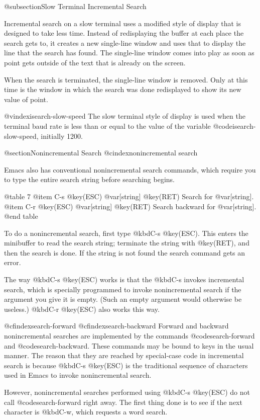 {{{{{{@subsection{Slow Terminal Incremental Search}

  Incremental search on a slow terminal uses a modified style of
display that is designed to take less time.  Instead of redisplaying
the buffer at each place the search gets to, it creates a new single-line
window and uses that to display the line that the search has found.
The single-line window comes into play as soon as point gets outside
of the text that is already on the screen.

  When the search is terminated, the single-line window is removed.
Only at this time is the window in which the search was done
redisplayed to show its new value of point.

@vindex{isearch-slow-speed}
  The slow terminal style of display is used when the terminal baud
rate is less than or equal to the value of the variable
@code{isearch-slow-speed}, initially 1200.

@section{Nonincremental Search}
@cindex{nonincremental search}

  Emacs also has conventional nonincremental search commands, which
require you to type the entire search string before searching begins.

@table 7
@item C-s @key(ESC) @var[string] @key(RET)
Search for @var[string].
@item C-r @key(ESC) @var[string] @key(RET)
Search backward for @var[string].
@end table

  To do a nonincremental search, first type @kbd{C-s @key(ESC)}.
This enters the minibuffer to read the search string; terminate the
string with @key(RET), and then the search is done.  If the string is
not found the search command gets an error.

  The way @kbd{C-s @key(ESC)} works is that the @kbd{C-s} invokes
incremental search, which is specially programmed to invoke nonincremental
search if the argument you give it is empty.  (Such an empty argument would
otherwise be useless.)  @kbd{C-r @key(ESC)} also works this way.

@cfindex{search-forward}
@cfindex{search-backward}
  Forward and backward nonincremental searches are implemented by the commands
@code{search-forward} and @code{search-backward}.  These commands may be
bound to keys in the usual manner.  The reason that they are reached by
special-case code in incremental search is because @kbd{C-s @key(ESC)}
is the traditional sequence of characters used in Emacs to invoke
nonincremental search.

  However, nonincremental searches performed using @kbd{C-s @key(ESC)}
do not call @code{search-forward} right away.  The first thing done is to see
if the next character is @kbd{C-w}, which requests a word search.

}}}}}}
